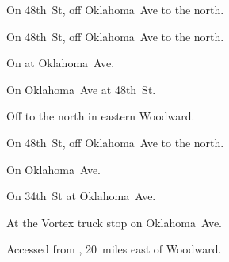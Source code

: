 
\begin{LocationList}

On 48th~St, off  Oklahoma~Ave to the north.

On 48th~St, off  Oklahoma~Ave to the north.

On   at  Oklahoma~Ave.

\Location{\GarageHQ \Garage}
On  Oklahoma~Ave at 48th~St.

Off  to the north in eastern Woodward.

On 48th~St, off  Oklahoma~Ave to the north.

On  Oklahoma~Ave.

\Location{\TruckService \Service}
On 34th~St at   Oklahoma~Ave.

At the Vortex truck stop on   Oklahoma~Ave.

Accessed from , 20~miles east of Woodward.

\end{LocationList}
